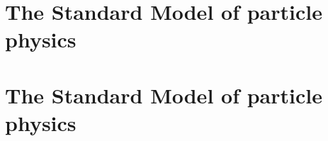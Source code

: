 \section{The Standard Model of particle physics} \label{sec:SM}\section{The Standard Model of particle physics} \label{sec:SM}